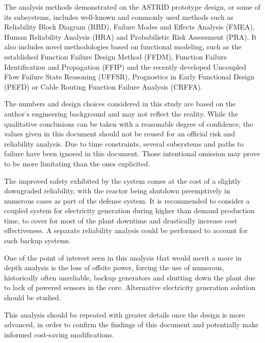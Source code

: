 \begin{SingleSpace}
The analysis methods demonstrated on the ASTRID prototype design, or some of its subsystems, includes well-known and commonly used methods such as Reliability Block Diagram (RBD), Failure Modes and Effects Analysis (FMEA), Human Reliability Analysis (HRA) and Probabilistic Risk Assessment (PRA). It also includes novel methodologies based on functional modeling, such as the established Function Failure Design Method (FFDM), Function Failure Identification and Propagation (FFIP) and the recently developed Uncoupled Flow Failure State Reasoning (UFFSR), Prognostics in Early Functional Design (PEFD) or Cable Routing Function Failure Analysis (CRFFA).

The numbers and design choices considered in this study are based on the author's engineering background and may not reflect the reality. While the qualitative conclusions can be taken with a reasonable degree of confidence, the values given in this document should not be reused for an official risk and reliability analysis. Due to time constraints, several subsystems and paths to failure have been ignored in this document. Those intentional omission may prove to be more limitating than the ones explicited.

The improved safety exhibited by the system comes at the cost of a slightly downgraded reliability, with the reactor being shutdown preemptively in numerous cases as part of the defense system. It is recommended to consider a coupled system for electricity generation during higher than demand production time, to cover for most of the plant downtime and drastically increase cost effectiveness. A separate reliability analysis could be performed to account for such backup systems.

One of the point of interest seen in this analysis that would merit a more in depth analysis is the loss of offsite power, forcing the use of numerous, historically often unreliable, backup generators and shutting down the plant due to lack of powered sensors in the core. Alternative electricity generation solution should be studied.

This analysis should be repeated with greater details once the design is more advanced, in order to confirm the findings of this document and potentially make informed cost-saving modifications.
\end{SingleSpace}
\clearpage
